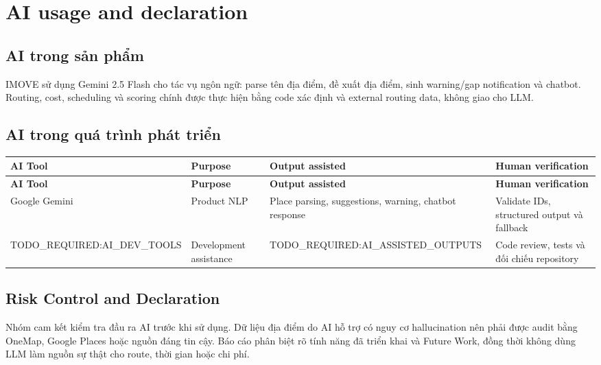 \chapter{AI usage and declaration}

\section{AI trong sản phẩm}

IMOVE sử dụng Gemini 2.5 Flash cho tác vụ ngôn ngữ: parse tên địa điểm, đề xuất địa điểm, sinh warning/gap notification và chatbot. Routing, cost, scheduling và scoring chính được thực hiện bằng code xác định và external routing data, không giao cho LLM.

\section{AI trong quá trình phát triển}

\begin{longtable}{p{3.2cm}p{4cm}p{4.5cm}p{4cm}}
\toprule
\textbf{AI Tool} & \textbf{Purpose} & \textbf{Output assisted} & \textbf{Human verification} \\
\midrule
\endfirsthead
\toprule
\textbf{AI Tool} & \textbf{Purpose} & \textbf{Output assisted} & \textbf{Human verification} \\
\midrule
\endhead
Google Gemini & Product NLP & Place parsing, suggestions, warning, chatbot response & Validate IDs, structured output và fallback \\
TODO\_REQUIRED:AI\_DEV\_TOOLS & Development assistance & TODO\_REQUIRED:AI\_ASSISTED\_OUTPUTS & Code review, tests và đối chiếu repository \\
\bottomrule
\end{longtable}

\section{Risk Control and Declaration}

Nhóm cam kết kiểm tra đầu ra AI trước khi sử dụng. Dữ liệu địa điểm do AI hỗ trợ có nguy cơ hallucination nên phải được audit bằng OneMap, Google Places hoặc nguồn đáng tin cậy. Báo cáo phân biệt rõ tính năng đã triển khai và Future Work, đồng thời không dùng LLM làm nguồn sự thật cho route, thời gian hoặc chi phí.

